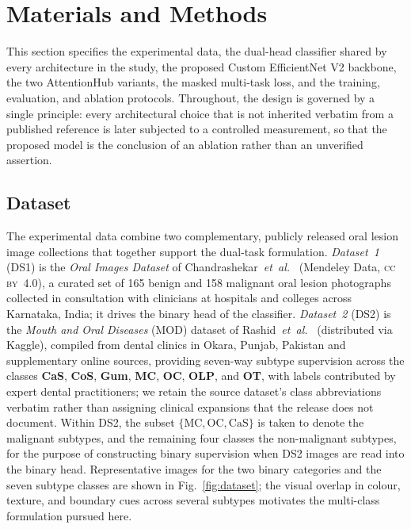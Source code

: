 \section{Materials and Methods}\label{sec:methods}

This section specifies the experimental data, the dual-head classifier
shared by every architecture in the study, the proposed Custom EfficientNet
V2 backbone, the two AttentionHub variants, the masked multi-task loss, and
the training, evaluation, and ablation protocols. Throughout, the design is
governed by a single principle: every architectural choice that is not
inherited verbatim from a published reference is later subjected to a
controlled measurement, so that the proposed model is the conclusion of an
ablation rather than an unverified assertion.

\subsection{Dataset}\label{ssec:dataset}

The experimental data combine two complementary, publicly released oral
lesion image collections that together support the dual-task formulation.
\emph{Dataset~1} (DS1) is the \emph{Oral Images Dataset} of
Chandrashekar~\textit{et~al.}~\cite{chandrashekar2021oral} (Mendeley Data,
\textsc{cc by}~4.0), a curated set of 165 benign and 158 malignant oral
lesion photographs collected in consultation with clinicians at hospitals
and colleges across Karnataka, India; it drives the binary head of the
classifier. \emph{Dataset~2} (DS2) is the \emph{Mouth and Oral Diseases}
(MOD) dataset of Rashid~\textit{et~al.}~\cite{rashid2022mod,ref19}
(distributed via Kaggle), compiled from dental clinics in Okara, Punjab,
Pakistan and supplementary online sources, providing seven-way subtype
supervision across the classes \textbf{CaS}, \textbf{CoS}, \textbf{Gum},
\textbf{MC}, \textbf{OC}, \textbf{OLP}, and \textbf{OT}, with labels
contributed by expert dental practitioners; we retain the source
dataset's class abbreviations verbatim rather than assigning clinical
expansions that the release does not document. Within DS2, the subset
$\{\text{MC},\text{OC},\text{CaS}\}$ is taken to denote the malignant
subtypes, and the remaining four classes the non-malignant subtypes, for
the purpose of constructing binary supervision when DS2 images are read
into the binary head. Representative images for the two binary categories
and the seven subtype classes are shown in Fig.~\ref{fig:dataset}; the
visual overlap in colour, texture, and boundary cues across several
subtypes motivates the multi-class formulation pursued here.

